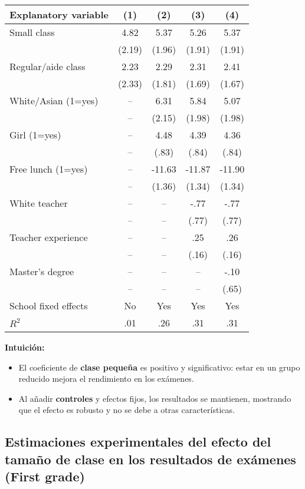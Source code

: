 \documentclass[12pt]{article}
\begin{document}
\begin{table}[H]
\centering
\begin{tabular}{lcccc}
\textbf{Explanatory variable} & (1) & (2) & (3) & (4) \\
\hline
Small class & 4.82 & 5.37 & 5.26 & 5.37 \\
 & (2.19) & (1.96) & (1.91) & (1.91) \\
Regular/aide class & 2.23 & 2.29 & 2.31 & 2.41 \\
 & (2.33) & (1.81) & (1.69) & (1.67) \\
White/Asian (1=yes) & -- & 6.31 & 5.84 & 5.07 \\
 & -- & (2.15) & (1.98) & (1.98) \\
Girl (1=yes) & -- & 4.48 & 4.39 & 4.36 \\
 & -- & (.83) & (.84) & (.84) \\
Free lunch (1=yes) & -- & -11.63 & -11.87 & -11.90 \\
 & -- & (1.36) & (1.34) & (1.34) \\
White teacher & -- & -- & -.77 & -.77 \\
 & -- & -- & (.77) & (.77) \\
Teacher experience & -- & -- & .25 & .26 \\
 & -- & -- & (.16) & (.16) \\
Master's degree & -- & -- & -- & -.10 \\
 & -- & -- & -- & (.65) \\
\hline
School fixed effects & No & Yes & Yes & Yes \\
$R^2$ & .01 & .26 & .31 & .31 \\
\end{tabular}
\end{table}

\textbf{Intuición:}
\begin{itemize}
    \item El coeficiente de \textbf{clase pequeña} es positivo y significativo: estar en un grupo reducido mejora el rendimiento en los exámenes.
    \item Al añadir \textbf{controles} y efectos fijos, los resultados se mantienen, mostrando que el efecto es robusto y no se debe a otras características.
\end{itemize}

\subsection*{\noindent\textbf{Estimaciones experimentales del efecto del tamaño de clase en los resultados de exámenes (First grade)}}
\end{document}
